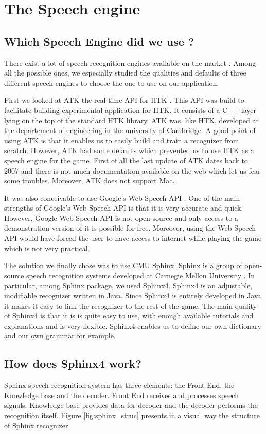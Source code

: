 \section*{The Speech engine}
\subsection*{Which Speech Engine did we use ?}
There exist a lot of speech recognition engines available on the market \cite{list_rec_soft}. Among all the possible ones, we especially studied the qualities and defaults of three different speech engines to choose the one to use on our application. 

First we looked at ATK the real-time API for HTK \cite{atk}. This API was build to facilitate building experimental application for HTK. It consists of a C++ layer lying on the top of the standard HTK library. ATK was, like HTK, developed at the departement of engineering in the university of Cambridge. A good point of using ATK is that it enables us to easily build and train a recognizer from scratch. However, ATK had some defaults which prevented us to use HTK as a speech engine for the game. First of all the last update of ATK dates back to 2007 and there is not much documentation available on the web which let us fear some troubles. Moreover, ATK does not support Mac. 

It was also conceivable to use Google's Web Speech API \cite{google_speech_api}. One of the main strengths of Google's Web Speech API is that it is very accurate and quick. However, Google Web Speech API is not open-source and only access to a demonstration version of it is possible for free. Moreover, using the Web Speech API would have forced  the user to have access to internet while playing the game which is not very practical. 

The solution we finally chose was to use CMU Sphinx. Sphinx is a group of open-source speech recognition systems developed at Carnegie Mellon University \cite{sphinx}. In particular, among Sphinx package, we used Sphinx4. Sphinx4 is an adjustable, modifiable recognizer written in Java. Since Sphinx4 is entirely developed in Java it makes it easy to link the recognizer to the rest of the game. The main quality of Sphinx4 is that it is is quite easy to use, with enough available tutorials and explanations and is very flexible. Sphinx4 enables us to define our own dictionary and our own grammar for example. 

\subsection*{How does Sphinx4 work?}
Sphinx speech recognition system has three elements: the Front End, the Knowledge base and the decoder. Front End receives and processes speech signals. Knowledge base provides data for decoder and the decoder performs the recognition itself. Figure \ref{fig:sphinx_struc} presents in a visual way the structure of Sphinx recognizer. 

